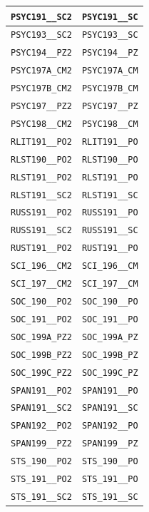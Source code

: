 \begin{longtable}{|p{4.4in}|p{4.4in}|}
    \verb|PSYC191__SC2| & \verb|PSYC191__SC|\\\hline
    \verb|PSYC193__SC2| & \verb|PSYC193__SC|\\\hline
    \verb|PSYC194__PZ2| & \verb|PSYC194__PZ|\\\hline
    \verb|PSYC197A_CM2| & \verb|PSYC197A_CM|\\\hline
    \verb|PSYC197B_CM2| & \verb|PSYC197B_CM|\\\hline
    \verb|PSYC197__PZ2| & \verb|PSYC197__PZ|\\\hline
    \verb|PSYC198__CM2| & \verb|PSYC198__CM|\\\hline
    \verb|RLIT191__PO2| & \verb|RLIT191__PO|\\\hline
    \verb|RLST190__PO2| & \verb|RLST190__PO|\\\hline
    \verb|RLST191__PO2| & \verb|RLST191__PO|\\\hline
    \verb|RLST191__SC2| & \verb|RLST191__SC|\\\hline
    \verb|RUSS191__PO2| & \verb|RUSS191__PO|\\\hline
    \verb|RUSS191__SC2| & \verb|RUSS191__SC|\\\hline
    \verb|RUST191__PO2| & \verb|RUST191__PO|\\\hline
    \verb|SCI_196__CM2| & \verb|SCI_196__CM|\\\hline
    \verb|SCI_197__CM2| & \verb|SCI_197__CM|\\\hline
    \verb|SOC_190__PO2| & \verb|SOC_190__PO|\\\hline
    \verb|SOC_191__PO2| & \verb|SOC_191__PO|\\\hline
    \verb|SOC_199A_PZ2| & \verb|SOC_199A_PZ|\\\hline
    \verb|SOC_199B_PZ2| & \verb|SOC_199B_PZ|\\\hline
    \verb|SOC_199C_PZ2| & \verb|SOC_199C_PZ|\\\hline
    \verb|SPAN191__PO2| & \verb|SPAN191__PO|\\\hline
    \verb|SPAN191__SC2| & \verb|SPAN191__SC|\\\hline
    \verb|SPAN192__PO2| & \verb|SPAN192__PO|\\\hline
    \verb|SPAN199__PZ2| & \verb|SPAN199__PZ|\\\hline
    \verb|STS_190__PO2| & \verb|STS_190__PO|\\\hline
    \verb|STS_191__PO2| & \verb|STS_191__PO|\\\hline
    \verb|STS_191__SC2| & \verb|STS_191__SC|\\\hline

\end{longtable}
